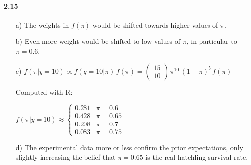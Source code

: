 \documentclass[fontsize=11pt,DIV=18,parskip=half]{scrartcl}
\begin{document}
\paragraph{2.15}
\begin{enumerate}
\item[a)] The weights in $f(\pi)$ would be shifted towards higher values of $\pi$.
\item[b)] Even more weight would be shifted to low values of $\pi$, in particular to $\pi=0.6$.
\item[c)] $f(\pi|y=10) \propto f(y=10|\pi)\, f(\pi) = \begin{pmatrix} 15 \\ 10 \end{pmatrix} \, \pi^{10} \, (1-\pi)^{5} \, f(\pi)$

Computed with R:

$f(\pi|y=10) \approx \left\{ \begin{array}{ll}0.281 & \pi=0.6\\0.428 & \pi=0.65\\ 0.208 & \pi=0.7\\ 0.083 & \pi=0.75 \end{array}\right.$ 

\item[d)] The experimental data more or less confirm the prior expectations, only slightly increasing the belief that $\pi=0.65$ is the real hatchling survival rate.
\end{enumerate}
\end{document}

